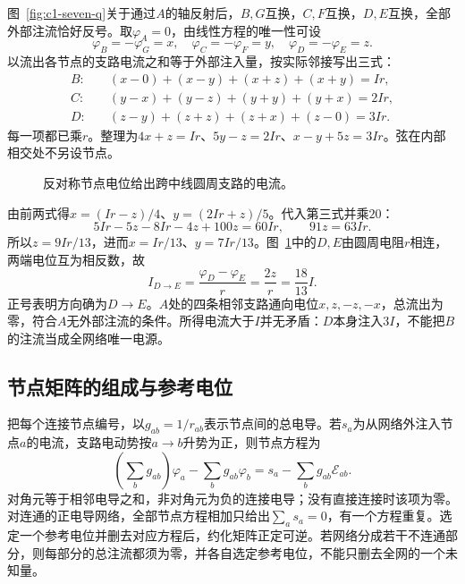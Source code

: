 \begin{solution}
图~\ref{fig:c1-seven-q}关于通过$A$的轴反射后，$B,G$互换，$C,F$互换，$D,E$互换，全部外部注流恰好反号。取$\varphi_A=0$，由线性方程的唯一性可设
\[
 \varphi_B=-\varphi_G=x,\quad \varphi_C=-\varphi_F=y,\quad
 \varphi_D=-\varphi_E=z.
\]
以流出各节点的支路电流之和等于外部注入量，按实际邻接写出三式：
\[
 \begin{aligned}
 B:&\quad (x-0)+(x-y)+(x+z)+(x+y)=Ir,\\
 C:&\quad (y-x)+(y-z)+(y+y)+(y+x)=2Ir,\\
 D:&\quad (z-y)+(z+z)+(z+x)+(z-0)=3Ir.
 \end{aligned}
\]
每一项都已乘$r$。整理为$4x+z=Ir$、$5y-z=2Ir$、$x-y+5z=3Ir$。弦在内部相交处不另设节点。
\begin{figure}[H]\centering
{}
\caption{反对称节点电位给出跨中线圆周支路的电流。}\label{fig:c1-seven-s}
\end{figure}
由前两式得$x=(Ir-z)/4$、$y=(2Ir+z)/5$。代入第三式并乘$20$：
\[
 5Ir-5z-8Ir-4z+100z=60Ir,
 \qquad91z=63Ir.
\]
所以$z=9Ir/13$，进而$x=Ir/13$、$y=7Ir/13$。图~\ref{fig:c1-seven-s}中的$D,E$由圆周电阻$r$相连，两端电位互为相反数，故
\[
 \boxed{I_{D\to E}=\frac{\varphi_D-\varphi_E}r=\frac{2z}r=\frac{18}{13}I}.
\]
正号表明方向确为$D\to E$。$A$处的四条相邻支路通向电位$x,z,-z,-x$，总流出为零，符合$A$无外部注流的条件。所得电流大于$I$并无矛盾：$D$本身注入$3I$，不能把$B$的注流当成全网络唯一电源。
\end{solution}



\subsection{节点矩阵的组成与参考电位}
把每个连接节点编号，以$g_{ab}=1/r_{ab}$表示节点间的总电导。若$s_a$为从网络外注入节点$a$的电流，支路电动势按$a\to b$升势为正，则节点方程为
\[
 \left(\sum_b g_{ab}\right)\varphi_a-\sum_b g_{ab}\varphi_b
 =s_a-\sum_b g_{ab}\mathcal E_{ab}.
\]
对角元等于相邻电导之和，非对角元为负的连接电导；没有直接连接时该项为零。对连通的正电导网络，全部节点方程相加只给出$\sum_as_a=0$，有一个方程重复。选定一个参考电位并删去对应方程后，约化矩阵正定可逆。若网络分成若干不连通部分，则每部分的总注流都须为零，并各自选定参考电位，不能只删去全网的一个未知量。

